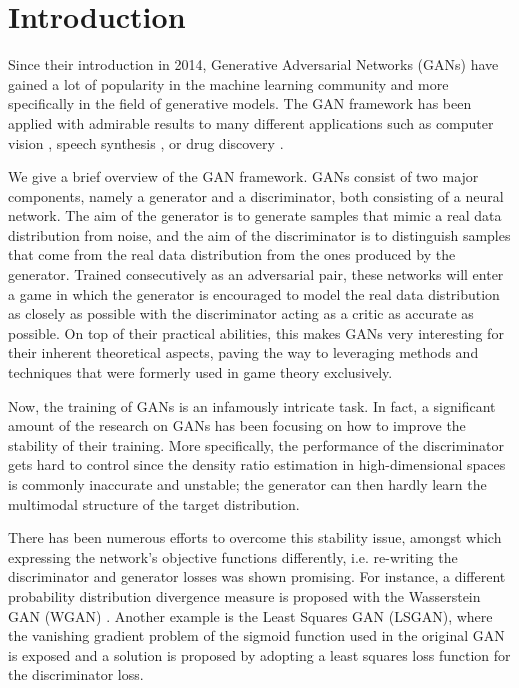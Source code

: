 \section{Introduction}

Since their introduction in 2014, Generative Adversarial Networks (GANs) \cite{goodfellow2014generative} have gained a lot of popularity in the machine learning community and more specifically in the field of generative models. The GAN framework has been applied with admirable results to many different applications such as computer vision \cite{DBLP:journals/corr/RadfordMC15} \cite{ledig2016photo} \cite{isola2017image}, speech synthesis \cite{kaneko2017generative} \cite{pascual2017segan}, or drug discovery \cite{guimaraes2017objective}. 

We give a brief overview of the GAN framework. GANs consist of two major components, namely a generator and a discriminator, both consisting of a neural network. The aim of the generator is to generate samples that mimic a real data distribution from noise, and the aim of the discriminator is to distinguish samples that come from the real data distribution from the ones produced by the generator. Trained consecutively as an adversarial pair, these networks will enter a game in which the generator is encouraged to model the real data distribution as closely as possible with the discriminator acting as a critic as accurate as possible. On top of their practical abilities, this makes GANs very interesting for their inherent theoretical aspects, paving the way to leveraging methods and techniques that were formerly used in game theory exclusively.

Now, the training of GANs is an infamously intricate task. In fact, a significant amount of the research on GANs has been focusing on how to improve the stability of their training. More specifically, the performance of the discriminator gets hard to control since the density ratio estimation in high-dimensional spaces is commonly inaccurate and unstable; the generator can then hardly learn the multimodal structure of the target distribution.


There has been numerous efforts to overcome this stability issue, amongst which expressing the network's objective functions differently, i.e. re-writing the discriminator and generator losses was shown promising. For instance, a different probability distribution divergence measure is proposed with the Wasserstein GAN (WGAN) \cite{arjovsky2017wasserstein}. Another example is the Least Squares GAN (LSGAN), where the vanishing gradient problem of the sigmoid function used in the original GAN is exposed and a solution is proposed by adopting a least squares loss function for the discriminator loss.  

